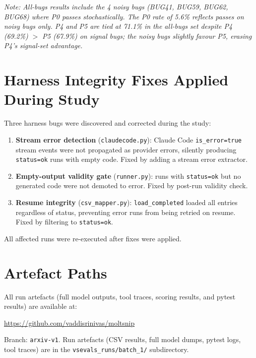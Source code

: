 \documentclass[10pt,a4paper,twocolumn]{article}
\begin{document}
\emph{Note: All-bugs results include the 4 noisy bugs (BUG41, BUG59, BUG62, BUG68) where P0 passes stochastically. The P0 rate of 5.6\% reflects passes on noisy bugs only. P4 and P5 are tied at 71.1\% in the all-bugs set despite P4 (69.2\%) $>$ P5 (67.9\%) on signal bugs; the noisy bugs slightly favour P5, erasing P4's signal-set advantage.}

\section{Harness Integrity Fixes Applied During Study}
\label{app:harness-fixes}

Three harness bugs were discovered and corrected during the study:

\begin{enumerate}
    \item \textbf{Stream error detection} (\texttt{claudecode.py}): Claude Code \texttt{is\_error=true} stream events were not propagated as provider errors, silently producing \texttt{status=ok} runs with empty code. Fixed by adding a stream error extractor.
    \item \textbf{Empty-output validity gate} (\texttt{runner.py}): runs with \texttt{status=ok} but no generated code were not demoted to error. Fixed by post-run validity check.
    \item \textbf{Resume integrity} (\texttt{csv\_mapper.py}): \texttt{load\_completed} loaded all entries regardless of status, preventing error runs from being retried on resume. Fixed by filtering to \texttt{status=ok}.
\end{enumerate}

All affected runs were re-executed after fixes were applied.

\section{Artefact Paths}
\label{app:artefacts}

All run artefacts (full model outputs, tool traces, scoring results, and pytest results) are available at:

\begin{center}
\url{https://github.com/vaddisrinivas/moltsnip}
\end{center}

\noindent Branch: \texttt{arxiv-v1}.
Run artefacts (CSV results, full model dumps, pytest logs, tool traces) are in the \texttt{vsevals\_runs/batch\_1/} subdirectory.
\end{document}

